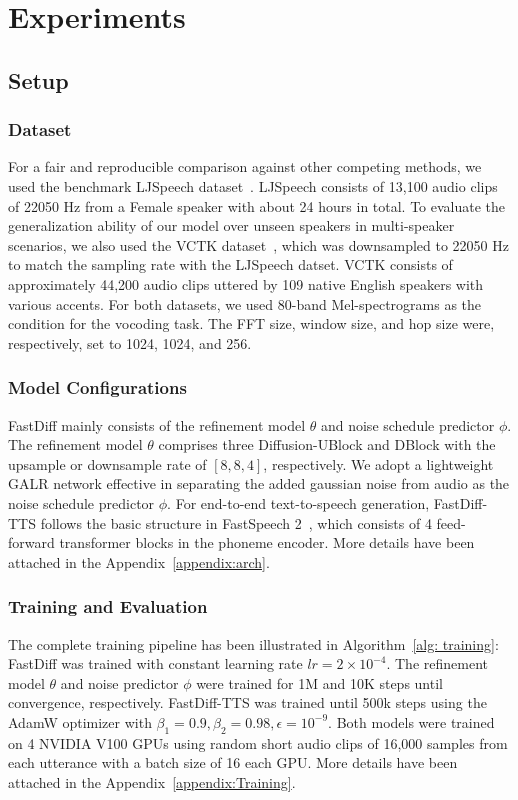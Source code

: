 \section{Experiments}

\subsection{Setup}

\subsubsection{Dataset}
For a fair and reproducible comparison against other competing methods, we used the benchmark LJSpeech dataset~\cite{LJSpeech}. LJSpeech consists of 13,100 audio clips of 22050 Hz from a Female speaker with about 24 hours in total. To evaluate the generalization ability of our model over unseen speakers in multi-speaker scenarios, we also used the VCTK dataset~\cite{yamagishi2019cstr}, which was downsampled to 22050 Hz to match the sampling rate with the LJSpeech datset. VCTK consists of approximately 44,200 audio clips uttered by 109 native English speakers with various accents. For both datasets, we used 80-band Mel-spectrograms as the condition for the vocoding task. The FFT size, window size, and hop size were, respectively, set to 1024, 1024, and 256. 

\subsubsection{Model Configurations}
FastDiff mainly consists of the refinement model $\theta$ and noise schedule predictor $\phi$. The refinement model $\theta$ comprises three Diffusion-UBlock and DBlock with the upsample or downsample rate of $[8, 8, 4]$, respectively. We adopt a lightweight GALR network effective in separating the added gaussian noise from audio as the noise schedule predictor $\phi$. For end-to-end text-to-speech generation, FastDiff-TTS follows the basic structure in FastSpeech 2~\cite{ren2020fastspeech}, which consists of 4 feed-forward transformer blocks in the phoneme encoder. More details have been attached in the Appendix~\ref{appendix:arch}. 

\subsubsection{Training and Evaluation}
The complete training pipeline has been illustrated in Algorithm~\ref{alg: training}: FastDiff was trained with constant learning rate $lr = 2\times 10^{-4}$. The refinement model $\theta$ and noise predictor $\phi$ were trained for 1M and 10K steps until convergence, respectively. FastDiff-TTS was trained until 500k steps using the AdamW optimizer with $\beta_{1}=0.9,\beta_{2}=0.98,\epsilon=10^{-9}$. Both models were trained on 4 NVIDIA V100 GPUs using random short audio clips of 16,000 samples from each utterance with a batch size of 16 each GPU. More details have been attached in the Appendix~\ref{appendix:Training}.

